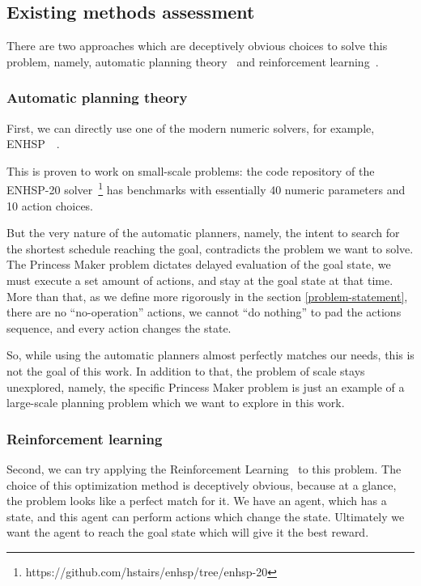\documentclass[11pt, a4paper]{article}
\begin{document}
	\subsection{Existing methods assessment}\label{introduction:assessment}

	There are two approaches which are deceptively obvious choices to solve this problem, namely, automatic planning theory~\cite{automaticPlanning} and reinforcement learning~\cite{sutton2018reinforcement}.
	
  \subsubsection{Automatic planning theory}
	First, we can directly use one of the modern numeric solvers, for example, ENHSP~\cite{enhsp::scala2020subgoaling}~\cite{enhsp::Scala2016IntervalBasedRF}.
	
	This is proven to work on small-scale problems: the code repository of the ENHSP-20 solver~\footnote{https://github.com/hstairs/enhsp/tree/enhsp-20} has benchmarks with essentially 40 numeric parameters and 10 action choices.
	
	But the very nature of the automatic planners, namely, the intent to search for the shortest schedule reaching the goal, contradicts the problem we want to solve.
	The Princess Maker problem dictates delayed evaluation of the goal state, we must execute a set amount of actions, and stay at the goal state at that time.
	More than that, as we define more rigorously in the section \ref{problem-statement}, there are no ``no-operation'' actions, we cannot ``do nothing'' to pad the actions sequence, and every action changes the state.
	
	So, while using the automatic planners almost perfectly matches our needs, this is not the goal of this work.
	In addition to that, the problem of scale stays unexplored, namely, the specific Princess Maker problem is just an example of a large-scale planning problem which we want to explore in this work.

  \subsubsection{Reinforcement learning}
	Second, we can try applying the Reinforcement Learning~\cite{sutton2018reinforcement} to this problem.
	The choice of this optimization method is deceptively obvious, because at a glance, the problem looks like a perfect match for it.
	We have an agent, which has a state, and this agent can perform actions which change the state.
	Ultimately we want the agent to reach the goal state which will give it the best reward.
	
\end{document}
